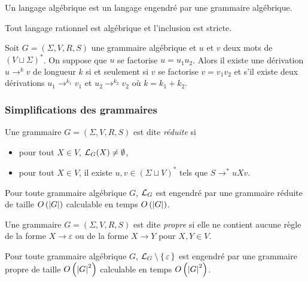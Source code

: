 \documentclass[../../agregation.tex]{subfiles}
\begin{document}
\begin{defn}
	Un langage algébrique est un langage engendré par une grammaire algébrique.
\end{defn}

\begin{prop}
	Tout langage rationnel est algébrique et l'inclusion
	est stricte.
\end{prop}

\begin{lem}[Fondamental]
	Soit $G=(\Sigma,V,R,S)$ une grammaire algébrique et $u$ et $v$ deux mots de $(V\sqcup \Sigma)^*$. On suppose que $u$ se factorise $u=u_1u_2$. Alors il existe une dérivation $u\to^k v$ de longueur $k$ si et seulement si $v$ se factorise $v=v_1v_2$ et s'il existe deux dérivations $u_1\to^{k_1}v_1$ et $u_2\to^{k_2}v_2$ où $k=k_1+k_2$.
\end{lem}



\subsubsection{Simplifications des grammaires} %

\begin{defn}
	Une grammaire $G=(\Sigma,V,R,S)$ est dite \emph{réduite} si
	\begin{itemize}
		\item pour tout $X\in V$, $\mathcal{L}_G(X)\not=\emptyset$,
		\item pour tout $X\in V$, il existe $u,v\in(\Sigma\sqcup V)^*$ tels que $S\to^*uXv$.
	\end{itemize}
\end{defn}

\begin{prop}
	Pour toute grammaire algébrique $G$, $\mathcal{L}_{G}$ est engendré par une grammaire réduite de taille $O\left(\left|G\right|\right)$
	calculable en temps $O\left(\left|G\right|\right)$.
\end{prop}

\begin{defn}
	Une grammaire $G=(\Sigma,V,R,S)$ est dite \emph{propre} si elle ne contient aucune règle de la forme $X\to \varepsilon$ ou de la forme $X\to Y$ pour $X,Y\in V$.
\end{defn}

\begin{prop}
	Pour toute grammaire algébrique $G$, $\mathcal{L}_{G}\setminus\set{\varepsilon}$ est engendré par une grammaire
	propre de taille $O\left(\left|G\right|^{2}\right)$ calculable en temps $O\left(\left|G\right|^{2}\right)$.
\end{prop}
\end{document}
